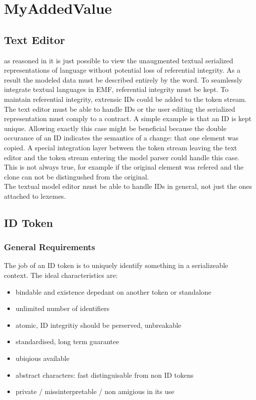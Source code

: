 \chapter{MyAddedValue}
\section{Text Editor}
as reasoned in  it is just possible to view the unaugmented textual serialized representations of language without potential loss of referential integrity. As a result the modeled data must be described entirely by the word. To seamlessly integrate textual languages in EMF, referential integrity must be kept. To maintain referential integrity, extrensic IDs could be added  to the token stream. The text editor must be able to handle IDs or the user editing the serialized representation must comply to a contract. A simple example is that an ID is kept unique. Allowing exactly this case might be beneficial because the double occurance of an ID indicates the semantics of a change: that one element was copied. A special integration layer between the token stream leaving the text editor and the token stream entering the model parser could handle this case. This is not always true, for example if the original element was refered and the clone can not be distingushed from the original. \\
The textual model editor must be able to handle IDs in general, not just the ones attached to lexemes. 


\section{ID Token}
\subsection{General Requirements}
The job of an ID token is to uniquely identify something in a serializeable context. 
The ideal characteristics are:
\begin{itemize}
	\item bindable and existence depedant on another token or standalone
	\item unlimited number of identifiers
	\item atomic, ID integritiy should be perserved, unbreakable
	\item standardised, long term guarantee
	\item ubiqious available
	\item abstract characters: fast distinguisable from non ID tokens
	\item private / missinterpretable / non amigious in its use
\end{itemize}

